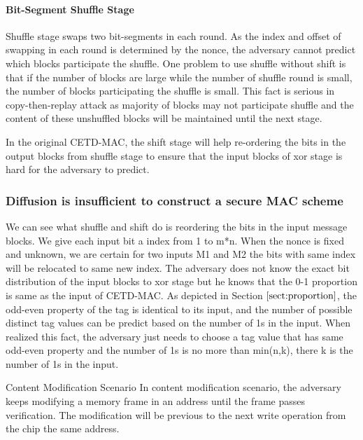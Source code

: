 \paragraph{Bit-Segment Shuffle Stage}
Shuffle stage swaps two bit-segments in each round. As the index and offset of swapping in each round is determined by the nonce, the adversary cannot predict which blocks participate the shuffle. One problem to use shuffle without shift is that if the number of blocks are large while the number of shuffle round is small, the number of blocks participating the shuffle is small. This fact is serious in copy-then-replay attack as majority of blocks may not participate shuffle and the content of these unshuffled blocks will be maintained until the next stage. %

 In the original CETD-MAC, the shift stage will help re-ordering the bits in the output blocks from shuffle stage to ensure that the input blocks of xor stage is hard for the adversary to predict. 

\subsubsection{Diffusion is insufficient to construct a secure MAC scheme}\label{par:diffusion}
We can see what shuffle and shift do is reordering the bits in the input message
blocks. We give each input bit a index from 1 to m*n. When the nonce is fixed
and unknown, we are certain for two inputs M1 and M2 the bits with same index
will be relocated to same new index. The adversary does not know the exact bit
distribution of the input blocks to xor stage but he knows that the 0-1
proportion is same as the input of CETD-MAC. As depicted in Section $\ref{sect:proportion}$, the odd-even property of the tag is identical to its input, and the number of possible distinct tag values can be predict based on the number of 1s in the input. When realized this fact, the adversary just needs to choose a tag value that has same odd-even property and the number of 1s is no more than min(n,k), there k is the number of 1s in the input.

Content Modification Scenario
In content modification scenario, the adversary keeps modifying a memory frame in an address until the frame passes verification. The modification will be previous to the next write operation from the chip the same address. 


